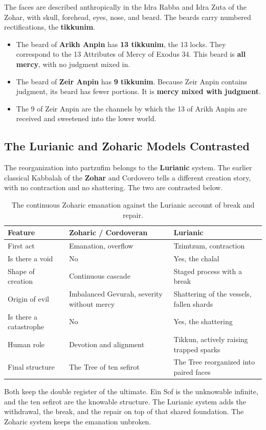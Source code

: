 The faces are described anthropically in the Idra Rabba and Idra Zuta of the Zohar, with skull,
forehead, eyes, nose, and beard. The beards carry numbered rectifications, the \textbf{tikkunim}.

\begin{itemize}
 \item The beard of \textbf{Arikh Anpin} has \textbf{13 tikkunim}, the 13 locks. They correspond to the
 13 Attributes of Mercy of Exodus 34. This beard is \textbf{all mercy}, with no judgment mixed in.
 \item The beard of \textbf{Zeir Anpin} has \textbf{9 tikkunim}. Because Zeir Anpin contains judgment,
 its beard has fewer portions. It is \textbf{mercy mixed with judgment}.
 \item The 9 of Zeir Anpin are the channels by which the 13 of Arikh Anpin are received and sweetened
 into the lower world.
\end{itemize}

\subsection{The Lurianic and Zoharic Models Contrasted}

The reorganization into partzufim belongs to the \textbf{Lurianic} system. The earlier classical
Kabbalah of the \textbf{Zohar} and Cordovero tells a different creation story, with no contraction and
no shattering. The two are contrasted below.

\begin{longtable}{L{3.2cm} L{4.4cm} L{4.4cm}}
\caption{The continuous Zoharic emanation against the Lurianic account of break and repair.}\\
\toprule
\textbf{Feature} & \textbf{Zoharic / Cordoveran} & \textbf{Lurianic} \\
\midrule
First act & Emanation, overflow & Tzimtzum, contraction \\
Is there a void & No & Yes, the chalal \\
Shape of creation & Continuous cascade & Staged process with a break \\
Origin of evil & Imbalanced Gevurah, severity without mercy & Shattering of the vessels, fallen shards \\
Is there a catastrophe & No & Yes, the shattering \\
Human role & Devotion and alignment & Tikkun, actively raising trapped sparks \\
Final structure & The Tree of ten sefirot & The Tree reorganized into paired faces \\
\bottomrule
\end{longtable}

Both keep the double register of the ultimate. Ein Sof is the unknowable infinite, and the ten sefirot
are the knowable structure. The Lurianic system adds the withdrawal, the break, and the repair on top of
that shared foundation. The Zoharic system keeps the emanation unbroken.
